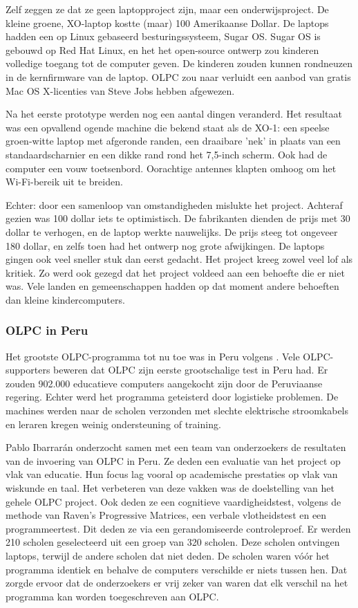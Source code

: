 Zelf zeggen ze dat ze geen laptopproject zijn, maar een onderwijsproject. De kleine groene, XO-laptop kostte (maar) 100 Amerikaanse Dollar. De laptops hadden een op Linux gebaseerd besturingssysteem, Sugar OS. Sugar OS is gebouwd op Red Hat Linux, en het het open-source ontwerp zou kinderen volledige toegang tot de computer geven. De kinderen zouden kunnen rondneuzen in de kernfirmware van de laptop. OLPC zou naar verluidt een aanbod van gratis Mac OS X-licenties van Steve Jobs hebben afgewezen. \autocite{Robertson2018}

Na het eerste prototype werden nog een aantal dingen veranderd. Het resultaat was een opvallend ogende machine die bekend staat als de XO-1: een speelse groen-witte laptop met afgeronde randen, een draaibare 'nek' in plaats van een standaardscharnier en een dikke rand rond het 7,5-inch scherm. Ook had de computer een vouw toetsenbord. Oorachtige antennes klapten omhoog om het Wi-Fi-bereik uit te breiden. \autocite{Robertson2018}

Echter: door een samenloop van omstandigheden mislukte het project. Achteraf gezien was 100 dollar iets te optimistisch. De fabrikanten dienden de prijs met 30 dollar te verhogen, en de laptop werkte nauwelijks. De prijs steeg tot ongeveer 180 dollar, en zelfs toen had het ontwerp nog grote afwijkingen. De laptops gingen ook veel sneller stuk dan eerst gedacht. Het project kreeg zowel veel lof als kritiek. Zo werd ook gezegd dat het project voldeed aan een behoefte die er niet was. Vele landen en gemeenschappen hadden op dat moment andere behoeften dan kleine kindercomputers. \autocite{Robertson2018}

\subsubsection{OLPC in Peru}
Het grootste OLPC-programma tot nu toe was in Peru volgens \autocite{Trucano2012}. Vele OLPC-supporters beweren dat OLPC zijn eerste grootschalige test in Peru had. Er zouden 902.000 educatieve computers aangekocht zijn door de Peruviaanse regering. Echter werd het programma geteisterd door logistieke problemen. De machines werden naar de scholen verzonden met slechte elektrische stroomkabels en leraren kregen weinig ondersteuning of training. \autocite{Robertson2018}

Pablo Ibarrarán onderzocht samen met een team van onderzoekers de resultaten van de invoering van OLPC in Peru. \autocite{Ibarraran2012} Ze deden een evaluatie van het project op vlak van educatie. Hun focus lag vooral op academische prestaties op vlak van wiskunde en taal. Het verbeteren van deze vakken was de doelstelling van het gehele OLPC project. Ook deden ze een cognitieve vaardigheidstest, volgens de methode van Raven's Progressive Matrices, een verbale vlotheidstest en een programmeertest. Dit deden ze via een gerandomiseerde controleproef. Er werden 210 scholen geselecteerd uit een groep van 320 scholen. Deze scholen ontvingen laptops, terwijl de andere scholen dat niet deden. De scholen waren vóór het programma identiek en behalve de computers verschilde er niets tussen hen. Dat zorgde ervoor dat de onderzoekers er vrij zeker van waren dat elk verschil na het programma kan worden toegeschreven aan OLPC. \autocite{Ibarraran2012}

